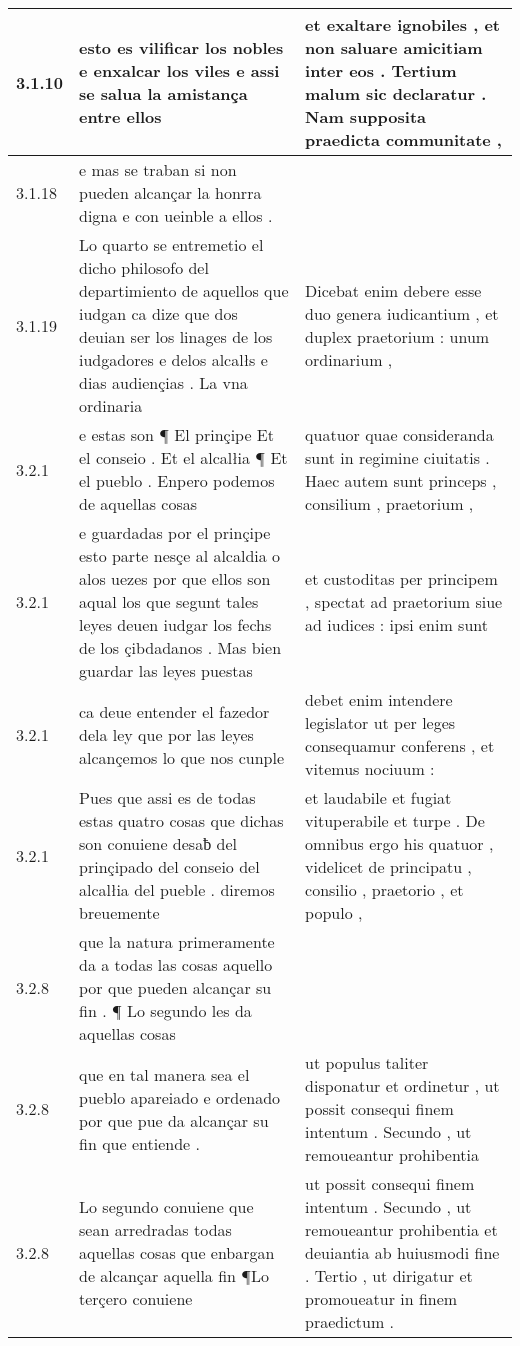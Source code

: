 \begin{tabular}{|p{1cm}|p{6.5cm}|p{6.5cm}|}
3.1.10 & esto es vilificar los nobles e enxalcar los viles e assi se salua la amistança entre ellos & et exaltare ignobiles , et non saluare amicitiam inter eos . Tertium malum sic declaratur . Nam supposita praedicta communitate , \\\hline
3.1.18 & e mas se traban si non pueden alcançar la honrra digna e con ueinble a ellos . &  \\\hline
3.1.19 & Lo quarto se entremetio el dicho philosofo del departimiento de aquellos que iudgan ca dize que dos deuian ser los linages de los iudgadores e delos alcalłs e dias audiençias . La vna ordinaria & Dicebat enim debere esse duo genera iudicantium , et duplex praetorium : unum ordinarium , \\\hline
3.2.1 & e estas son ¶ El prinçipe Et el conseio . Et el alcalłia ¶ Et el pueblo . Enpero podemos de aquellas cosas & quatuor quae consideranda sunt in regimine ciuitatis . Haec autem sunt princeps , consilium , praetorium , \\\hline
3.2.1 & e guardadas por el prinçipe esto parte nesçe al alcaldia o alos uezes por que ellos son aqual los que segunt tales leyes deuen iudgar los fechs de los çibdadanos . Mas bien guardar las leyes puestas & et custoditas per principem , spectat ad praetorium siue ad iudices : ipsi enim sunt \\\hline
3.2.1 & ca deue entender el fazedor dela ley que por las leyes alcançemos lo que nos cunple & debet enim intendere legislator ut per leges consequamur conferens , et vitemus nociuum : \\\hline
3.2.1 & Pues que assi es de todas estas quatro cosas que dichas son conuiene desaƀ del prinçipado del conseio del alcalłia del pueble . diremos breuemente & et laudabile et fugiat vituperabile et turpe . De omnibus ergo his quatuor , videlicet de principatu , consilio , praetorio , et populo , \\\hline
3.2.8 & que la natura primeramente da a todas las cosas aquello por que pueden alcançar su fin . ¶ Lo segundo les da aquellas cosas &  \\\hline
3.2.8 & que en tal manera sea el pueblo apareiado e ordenado por que pue da alcançar su fin que entiende . & ut populus taliter disponatur et ordinetur , ut possit consequi finem intentum . Secundo , ut remoueantur prohibentia \\\hline
3.2.8 & Lo segundo conuiene que sean arredradas todas aquellas cosas que enbargan de alcançar aquella fin ¶Lo terçero conuiene & ut possit consequi finem intentum . Secundo , ut remoueantur prohibentia et deuiantia ab huiusmodi fine . Tertio , ut dirigatur et promoueatur in finem praedictum . \\\hline

\end{tabular}
